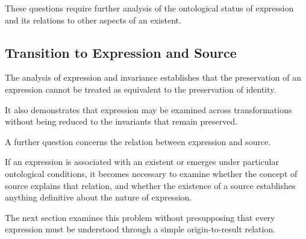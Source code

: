 These questions require further analysis of
the ontological status of expression and its
relations to other aspects of an existent.

\subsection{Transition to Expression and Source}

The analysis of expression and invariance establishes
that the preservation of an expression cannot
be treated as equivalent to the preservation
of identity.

It also demonstrates that expression may be
examined across transformations without being
reduced to the invariants that remain preserved.

A further question concerns the relation between
expression and source.

If an expression is associated with an existent
or emerges under particular ontological conditions,
it becomes necessary to examine whether the concept
of source explains that relation, and whether
the existence of a source establishes anything
definitive about the nature of expression.

The next section examines this problem without
presupposing that every expression must be
understood through a simple origin-to-result
relation.

